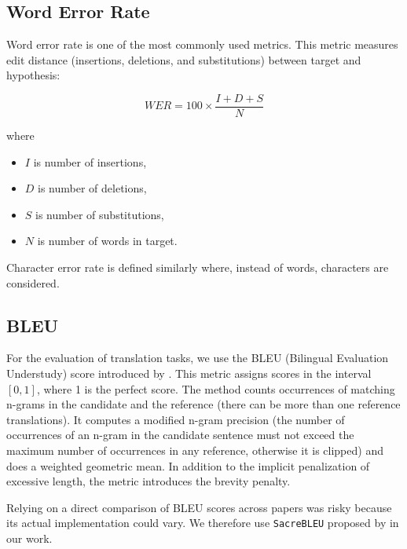 \subsection{Word Error Rate}
Word error rate is one of the most commonly used metrics. This metric measures edit distance (insertions, deletions, and substitutions) between target and hypothesis:

\begin{equation}
WER = 100 \times \frac{I + D + S}{N}
\end{equation}

where

\begin{itemize}
	\item $I$ is number of insertions,
	\item $D$ is number of deletions,
	\item $S$ is number of substitutions,
	\item $N$ is number of words in target.
\end{itemize}

Character error rate is defined similarly where, instead of words, characters are considered.

\subsection{BLEU}
For the evaluation of translation tasks, we use the BLEU (Bilingual Evaluation Understudy) score introduced by . This metric assigns scores in the interval $[0,1]$, where 1 is the perfect score. The method counts occurrences of matching n-grams in the candidate and the reference (there can be more than one reference translations). It computes a modified n-gram precision (the number of occurrences of an n-gram in the candidate sentence must not exceed the maximum number of occurrences in any reference, otherwise it is clipped) and does a weighted geometric mean. In addition to the implicit penalization of excessive length, the metric introduces the brevity penalty.

Relying on a direct comparison of BLEU scores across papers was risky because its actual implementation could vary. We therefore use \texttt{SacreBLEU} proposed by  in our work.